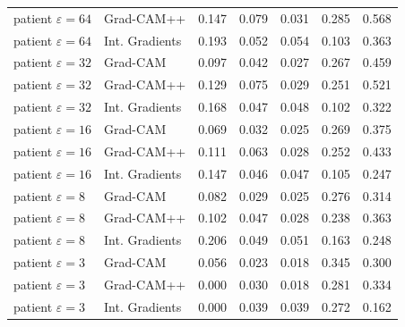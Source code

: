 {\begin{longtable}{llrrrrr}
patient $\varepsilon=64$ & Grad-CAM++ & 0.147 & 0.079 & 0.031 & 0.285 & 0.568 \\
patient $\varepsilon=64$ & Int. Gradients & 0.193 & 0.052 & 0.054 & 0.103 & 0.363 \\
patient $\varepsilon=32$ & Grad-CAM & 0.097 & 0.042 & 0.027 & 0.267 & 0.459 \\
patient $\varepsilon=32$ & Grad-CAM++ & 0.129 & 0.075 & 0.029 & 0.251 & 0.521 \\
patient $\varepsilon=32$ & Int. Gradients & 0.168 & 0.047 & 0.048 & 0.102 & 0.322 \\
patient $\varepsilon=16$ & Grad-CAM & 0.069 & 0.032 & 0.025 & 0.269 & 0.375 \\
patient $\varepsilon=16$ & Grad-CAM++ & 0.111 & 0.063 & 0.028 & 0.252 & 0.433 \\
patient $\varepsilon=16$ & Int. Gradients & 0.147 & 0.046 & 0.047 & 0.105 & 0.247 \\
patient $\varepsilon=8$ & Grad-CAM & 0.082 & 0.029 & 0.025 & 0.276 & 0.314 \\
patient $\varepsilon=8$ & Grad-CAM++ & 0.102 & 0.047 & 0.028 & 0.238 & 0.363 \\
patient $\varepsilon=8$ & Int. Gradients & 0.206 & 0.049 & 0.051 & 0.163 & 0.248 \\
patient $\varepsilon=3$ & Grad-CAM & 0.056 & 0.023 & 0.018 & 0.345 & 0.300 \\
patient $\varepsilon=3$ & Grad-CAM++ & 0.000 & 0.030 & 0.018 & 0.281 & 0.334 \\
patient $\varepsilon=3$ & Int. Gradients & 0.000 & 0.039 & 0.039 & 0.272 & 0.162 \\
\end{longtable}}

